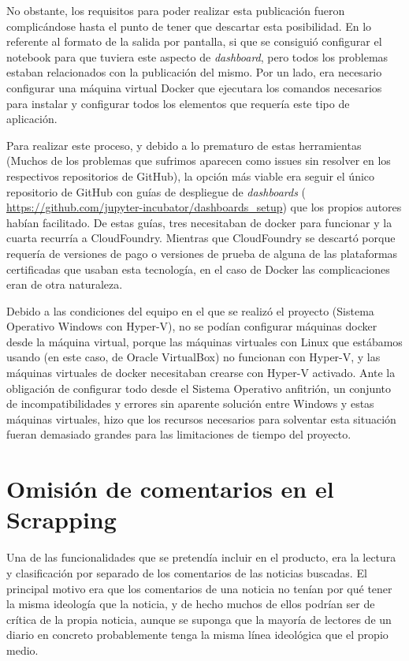 No obstante, los requisitos para poder realizar esta publicación fueron complicándose hasta el punto de tener que descartar esta posibilidad. En lo referente al formato de la salida por pantalla, si que se consiguió configurar el notebook para que tuviera este aspecto de \emph{dashboard}, pero todos los problemas estaban relacionados con la publicación del mismo. Por un lado, era necesario configurar una máquina virtual Docker que ejecutara los comandos necesarios para instalar y configurar todos los elementos que requería este tipo de aplicación. 

Para realizar este proceso, y debido a lo prematuro de estas herramientas (Muchos de los problemas que sufrimos aparecen como issues sin resolver en los respectivos repositorios de GitHub), la opción más viable era seguir el único repositorio de GitHub con guías de despliegue de \emph{dashboards} (\url{ https://github.com/jupyter-incubator/dashboards_setup}) que los propios autores habían facilitado. De estas guías, tres necesitaban de docker para funcionar y la cuarta recurría a CloudFoundry. Mientras que CloudFoundry se descartó porque requería de versiones de pago o versiones de prueba de alguna de las plataformas certificadas que usaban esta tecnología, en el caso de Docker las complicaciones eran de otra naturaleza.

Debido a las condiciones del equipo en el que se realizó el proyecto (Sistema Operativo Windows con Hyper-V), no se podían configurar máquinas docker desde la máquina virtual, porque las máquinas virtuales con Linux que estábamos usando (en este caso, de Oracle VirtualBox) no funcionan con Hyper-V, y las máquinas virtuales de docker necesitaban crearse con Hyper-V activado. Ante la obligación de configurar todo desde el Sistema Operativo anfitrión, un conjunto de incompatibilidades y errores sin aparente solución entre Windows y estas máquinas virtuales, hizo que los recursos necesarios para solventar esta situación fueran demasiado grandes para las limitaciones de tiempo del proyecto.


\section{Omisión de comentarios en el Scrapping}

Una de las funcionalidades que se pretendía incluir en el producto, era la lectura y clasificación por separado de los comentarios de las noticias buscadas. El principal motivo era que los comentarios de una noticia no tenían por qué tener la misma ideología que la noticia, y de hecho muchos de ellos podrían ser de crítica de la propia noticia, aunque se suponga que la mayoría de lectores de un diario en concreto probablemente tenga la misma línea ideológica que el propio medio.


